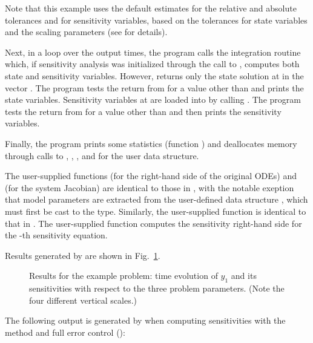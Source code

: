 Note that this example uses the default estimates for the relative and absolute tolerances 
 and  for sensitivity variables, based on the tolerances for state 
variables and the scaling parameters  (see  for details).

Next, in a loop over the  output times, the program calls the integration
routine  which, if sensitivity analysis was initialized through the call
to , computes both state and sensitivity variables. However,
 returns only the state solution at  in the vector .
The program tests the return from  for a value other than  and
prints the state variables.
Sensitivity variables at  are loaded into  by calling .
The program tests the return from  for a value other than  
and then prints the sensitivity variables.

Finally, the program prints some statistics (function ) 
and deallocates memory through calls
to , , 
, and  for the user data structure.

The user-supplied functions  (for the right-hand side of the original ODEs) and
 (for the system Jacobian) are identical to those in ,
with the notable exeption that model parameters are extracted from the user-defined
data structure , which must first be cast to the  type.
Similarly, the user-supplied function  is identical to that in
.  The user-supplied function  computes the
sensitivity right-hand side for the -th sensitivity equation.

Results generated by  are shown in
Fig.~\ref{f:cvsRoberts_FSA_dns}. 
\begin{figure}
  {\centerline{}}
  \caption{Results for the  example problem:
    time evolution of $y_1$ and its sensitivities with respect to the
    three problem parameters.  (Note the four different vertical scales.)}
  \label{f:cvsRoberts_FSA_dns}
\end{figure}
The following output is generated by  when computing
sensitivities with the  method and full error
control ():

